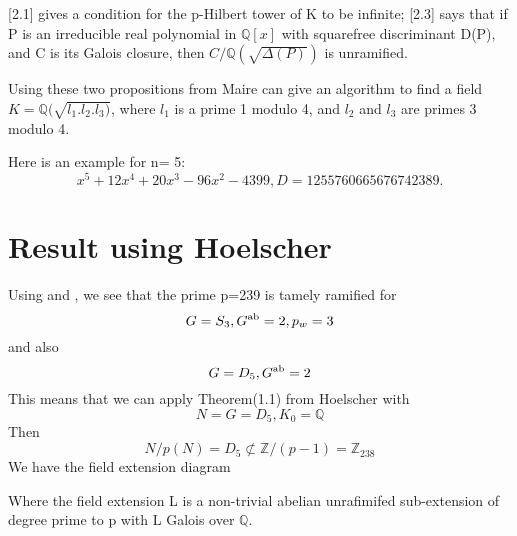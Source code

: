 \documentclass[12pt]{extarticle}
\newcommand{\<}{\langle}
\renewcommand{\>}{\rangle}
\theoremstyle{definition}
\begin{document}
\cite{MAIR}[2.1] gives a condition for the p-Hilbert tower of K to be infinite; \cite{MAIR}[2.3] says that if P is an irreducible real polynomial in $\mathbb{Q}[x]$ with squarefree discriminant D(P), and C is its Galois closure, then $C/\mathbb{Q}(\sqrt{\Delta(P)})$ is unramified.
\par
Using these two propositions from Maire can give an algorithm to find a field $K=\mathbb{Q}(\sqrt{l_1.l_2.l_3)}$, where $l_1$ is a prime 1 modulo 4, and $l_2$ and $l_3$ are primes 3 modulo 4. 
\par
Here is an example for n= 5:
\begin{equation}
    x^5 + 12x^4 + 20x^3 - 96x^2 - 4399, D=1255760665676742389.
\end{equation}

\section{Result using Hoelscher}

Using \cite{HOEL} and \cite{JONE}, we see that 
the prime p=239 is tamely ramified for 
\begin{equation}
  G=S_3,G\textsuperscript{ab} = 2, p_w =3  
\end{equation} and also 
\begin{equation}
    G=D_5,G\textsuperscript{ab} = 2 
\end{equation}
This means that we can apply Theorem(1.1) from Hoelscher with
\begin{equation}
    N = G = D_5, K_0 = \mathbb{Q}
\end{equation}
Then 
\begin{equation}
N/p(N) = D_5 \not\subset \mathbb{Z}/(p-1) = \mathbb{Z}_{238}
\end{equation}
We have the field extension diagram
\begin{center}
    
\end{center}
\par
Where the field extension L is a non-trivial abelian unrafimifed sub-extension of degree prime to p with L Galois over $\mathbb{Q}$.
\end{document}
